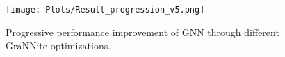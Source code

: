 


\begin{figure}[t!]
\begin{center}
\texttt{[image: Plots/Result\_progression\_v5.png]}%
\end{center}
\caption{Progressive performance improvement of GNN through different GraNNite optimizations.}\label{plot:gnn_progression}
\end{figure}



